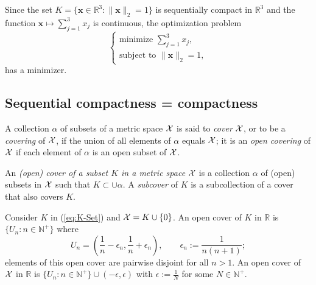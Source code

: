 \begin{exm}
  Since the set $K=\{\mathbf{x}\in \mathbb{R}^3: \|\mathbf{x}\|_2=1\}$
  is sequentially compact in $\mathbb{R}^3$ and the function
  $\mathbf{x}\mapsto \sum_{j=1}^3x_j$ is continuous,
  the optimization problem
  \begin{displaymath}
    \left\{
      \begin{array}{l}
        \text{minimize } \sum_{j=1}^3 x_j,
        \\
        \text{subject to } \|\mathbf{x}\|_2=1,
      \end{array}
    \right.
  \end{displaymath}
  has a minimizer.
\end{exm}



\subsection{Sequential compactness = compactness}
\label{sec:sequCompIsCompactness}

\begin{defn}
  A collection $\alpha$ of subsets of a metric space ${\cal X}$
   is said to \emph{cover} ${\cal X}$,
   or to be a \emph{covering} of ${\cal X}$,
   if the union of all elements of $\alpha$
   equals ${\cal X}$;
   it is an \emph{open covering} of ${\cal X}$
   if each element of $\alpha$ is an open subset of ${\cal X}$.
\end{defn}

\begin{defn}
  An \emph{(open) cover of a subset $K$ in a metric space} ${\cal X}$
   is a collection $\alpha$ of (open) subsets in ${\cal X}$
   such that $K \subset \cup \alpha$.
  A \emph{subcover} of $K$ is a subcollection of a cover
   that also covers $K$.
\end{defn}

\begin{exm}
  \label{exm:openCoverOfSubsets}
  Consider $K$ in (\ref{eq:K-Set})
   and ${\cal X}=K\cup\{0\}$.
  An open cover of $K$ in $\mathbb{R}$
   is $\{U_n: n\in \mathbb{N}^+\}$
   where
  \begin{displaymath}
    U_n=\left(\frac{1}{n}-\epsilon_n,
      \frac{1}{n}+\epsilon_n\right),\qquad
    \epsilon_n := \frac{1}{n(n+1)}; 
  \end{displaymath}
  elements of this open cover are pairwise disjoint
  for all $n>1$.
  An open cover of ${\cal X}$ in $\mathbb{R}$
   is $\{U_n: n\in \mathbb{N}^+\}\cup (-\epsilon, \epsilon)$
   with $\epsilon:= \frac{1}{N}$ for some $N\in \mathbb{N}^+$.
\end{exm}

